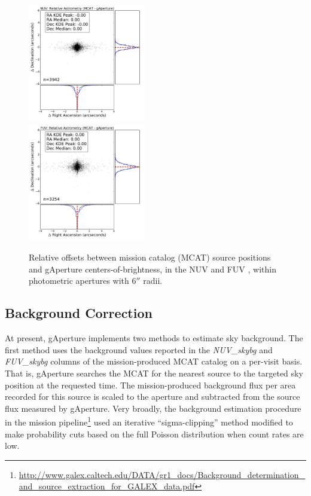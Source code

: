 \documentclass[trackchanges,preprint2]{aastex}
\begin{document}
\begin{figure}[h!]
\includegraphics[width=0.46\textwidth,keepaspectratio]{Fig02a.pdf}\\
\includegraphics[width=0.46\textwidth,keepaspectratio]{Fig02b.pdf}
\caption{Relative offsets between mission catalog (MCAT) source positions and gAperture centers-of-brightness, in the NUV  and FUV , within photometric apertures with $6''$ radii. 
\label{astrometry}}
\end{figure}

\subsection{Background Correction}
\label{bgcorr}
At present, gAperture implements two methods to estimate sky background. The first method uses the background values reported in the \emph{NUV\_skybg} and \emph{FUV\_skybg} columns of the mission-produced MCAT catalog on a per-visit basis. That is, gAperture searches the MCAT for the nearest source to the targeted sky position at the requested time. The mission-produced background flux per area recorded for this source is scaled to the aperture and subtracted from the source flux measured by gAperture. Very broadly, the background estimation procedure in the mission pipeline\footnote{\url{http://www.galex.caltech.edu/DATA/gr1_docs/Background_determination_and_source_extraction_for_GALEX_data.pdf}} used an iterative ``sigma-clipping'' method modified to make probability cuts based on the full Poisson distribution when count rates are low. 
\end{document}
